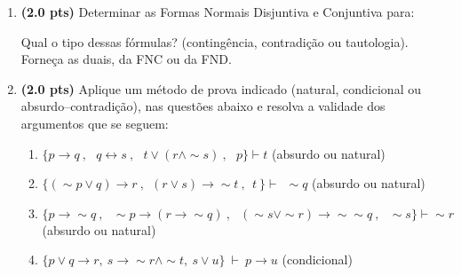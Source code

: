 \documentclass[11pt, a4paper,final]{article}
\begin{document}
\begin{enumerate}

\item {\bf (2.0 pts)} Determinar as Formas Normais Disjuntiva e Conjuntiva para:

Qual o tipo dessas fórmulas? (contingência, contradição ou tautologia). Forneça as duais, da FNC ou  da FND.


\item {\bf (2.0 pts)} Aplique um método de prova indicado (natural, condicional ou absurdo--contradição), nas questões abaixo e resolva a validade dos argumentos que se seguem: 

\begin{enumerate}
\item $\{p\rightarrow  q \: , \:\:\: q \leftrightarrow s \: , \:\:\:
 t \vee ( r \wedge \sim s)\: , \:\:\: p \} \vdash  t $ \hskip 1cm (absurdo ou natural)
 
\item  $\{ ( \sim p \vee q) \rightarrow r \: ,
  \:\: (r \vee s)  \rightarrow \sim t \: ,
    \:\: t \:   \} \vdash \: \:  \sim  q $ \hskip 1cm (absurdo ou natural)

\item $\{p\rightarrow \sim q \: , \:\:\: \sim p \rightarrow (r \rightarrow \sim q)  \: , \:\:\: (\sim s \vee \sim r)\rightarrow \sim \sim q  \: , \:\:\: \sim s  \} \vdash  \sim r $ \hskip 1cm (absurdo ou natural)

\item $ \{ p \vee q \rightarrow r,~ s \rightarrow \sim r \wedge \sim t,~ s \vee u \} ~\vdash~ p \rightarrow u $ \hskip 1cm (condicional)
\end{enumerate}

\begin{comment}
\begin{enumerate}

 
\item  $\{ p \vee q \: ,
  \:\: q \rightarrow r \: ,
    \:\: p \rightarrow s \: ,
     \:\: \sim s   \} \vdash r \wedge (p \vee q) $
\end{enumerate}


\end{comment}
\end{enumerate}
\end{document}
